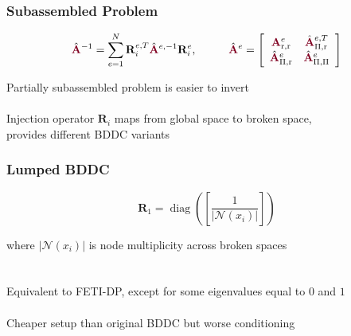 \documentclass{beamer}
\DeclareMathOperator{\diag}{diag}
\begin{document}
\begin{frame}
\begin{center}
\frametitle{Subassembled Problem}

\begin{equation}
\hat{\color{burgundy}\mathbf{A}}^{-1} = \sum_{e = 1}^N \mathbf{R}^{e, T}_i \hat{\color{burgundy}\mathbf{A}}^{e, -1} \mathbf{R}^e_i, \hspace{10mm}
\hat{\color{burgundy}\mathbf{A}}^e =
\left[ \begin{array}{c c}
{\color{burgundy}\mathbf{A}}_{\text{r}, \text{r}}^e  &  \hat{\color{burgundy}\mathbf{A}}_{\Pi, \text{r}}^{e, T}  \\
\hat{\color{burgundy}\mathbf{A}}_{\Pi, \text{r}}^e   &  \hat{\color{burgundy}\mathbf{A}}_{\Pi, \Pi}^e            \\
\end{array} \right]
\end{equation}

Partially subassembled problem is easier to invert\\

~\\

Injection operator $\mathbf{R}_i$ maps from global space to broken space,\\provides different BDDC variants

\end{center}
\end{frame}


\begin{frame}
\begin{center}
\frametitle{Lumped BDDC}

\begin{equation}
\mathbf{R}_1 = \diag \left( \left[ \frac{1}{\lvert \mathcal{N} \left( x_i \right) \rvert} \right] \right)
\end{equation}

where $\lvert \mathcal{N} \left( x_i \right) \rvert$ is node multiplicity across broken spaces\\

~\\

~\\

Equivalent to FETI-DP, except for some eigenvalues equal to $0$ and $1$ \cite{li2007use}\\

~\\

Cheaper setup than original BDDC but worse conditioning

\end{center}
\end{frame}
\end{document}
